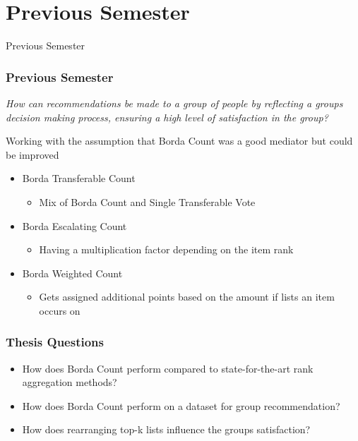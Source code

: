 \section{Previous Semester}
\begin{frame}
     \begin{center}
     	\huge Previous Semester
     \end{center}
\end{frame}

\begin{frame}
\frametitle{Previous Semester}
\begin{center}
\textit{How can recommendations be made to a group of people by reflecting a groups decision making process, ensuring a high level of satisfaction in the group?}
\end{center}

Working with the assumption that Borda Count was a good mediator but could be improved

\begin{itemize}
	\item Borda Transferable Count
		\begin{itemize}
			\item Mix of Borda Count and Single Transferable Vote
		\end{itemize}
		\item Borda Escalating Count
		\begin{itemize}
			\item Having a multiplication factor depending on the item rank
		\end{itemize}
	\item Borda Weighted Count
		\begin{itemize}
			\item Gets assigned additional points based on the amount if lists an item occurs on
		\end{itemize}
	\end{itemize}
\end{frame}

\begin{frame}
\frametitle{Thesis Questions}
	\begin{itemize}
		\item How does Borda Count perform compared to state-for-the-art rank aggregation methods?
		\item How does Borda Count perform on a dataset for group recommendation?
		\item How does rearranging top-k lists influence the groups satisfaction?
	\end{itemize}
\end{frame}

